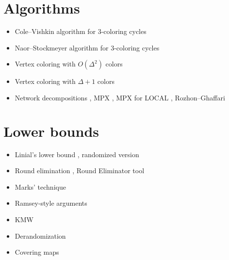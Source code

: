 \documentclass[a4paper,11pt]{article}
\begin{document}
\section{Algorithms}
\begin{itemize}
    \item Cole--Vishkin algorithm for 3-coloring cycles \cite{cole-vishkin-1986-deterministic-coin-tossing-with,goldberg-plotkin-shannon-1988-parallel-symmetry}
    \item Naor--Stockmeyer algorithm for 3-coloring cycles \cite{naor-stockmeyer-1995-what-can-be-computed-locally}
    \item Vertex coloring with $O(\Delta^2)$ colors \cite{linial-1992-locality-in-distributed-graph-algorithms}
    \item Vertex coloring with $\Delta+1$ colors \cite{maus-tonoyan-2022-linial-for-lists,barenboim-elkin-goldenberg-2022-locally-iterative}
    \item Network decompositions \cite{awerbuch-goldberg-etal-1989-network-decomposition-and}, MPX \cite{miller-peng-xu-2013-parallel-graph-decompositions-using}, MPX for LOCAL \cite{elkin-neiman-2022-distributed-strong-diameter-network}, Rozhon--Ghaffari \cite{rozhon-ghaffari-2020-polylogarithmic-time-deterministic}
\end{itemize}

\section{Lower bounds}
\begin{itemize}
    \item Linial's lower bound \cite{linial-1992-locality-in-distributed-graph-algorithms}, randomized version \cite{naor-1991-a-lower-bound-on-probabilistic-algorithms-for}
    \item Round elimination \cite{brandt-2019-an-automatic-speedup-theorem-for,brandt-fischer-etal-2016-a-lower-bound-for-the}, Round Eliminator tool \cite{olivetti-2020-brief-announcement-round-eliminator-a,olivetti-2025-round-eliminator-a-tool-for-automatic}
    \item Marks' technique \cite{marks-2016-a-determinacy-approach-to-borel,brandt-chang-etal-2022-local-problems-on-trees-from-the}
    \item Ramsey-style arguments \cite{naor-stockmeyer-1995-what-can-be-computed-locally,czygrinow-hanckowiak-wawrzyniak-2008-fast-distributed}
    \item KMW \cite{kuhn-moscibroda-wattenhofer-2004-what-cannot-be,kuhn-moscibroda-wattenhofer-2006-the-price-of-being,kuhn-moscibroda-wattenhofer-2016-local-computation,coupette-lenzen-2021-a-breezing-proof-of-the-kmw-bound}
    \item Derandomization \cite{naor-stockmeyer-1995-what-can-be-computed-locally,chang-kopelowitz-pettie-2019-an-exponential-separation,dahal-d-amore-etal-2023-brief-announcement-distributed}
    \item Covering maps \cite{angluin-1980-local-and-global-properties-in-networks-of,yamashita-kameda-1996-computing-on-anonymous-networks}
\end{itemize}
\end{document}
